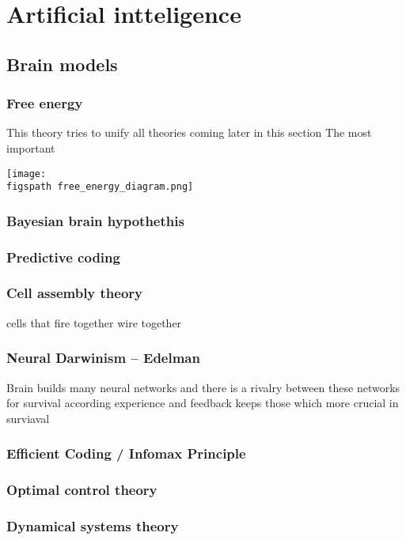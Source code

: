 \chapter{Artificial intteligence}


\section{Brain models}
    \subsection{Free energy}
        This theory tries to unify all theories coming later in this section
        The most important \cite{friston-2010-the-free-energy-principle-a-unified-brain-theory}
            
            
            \texttt{[image: \\figspath free\_energy\_diagram.png]}
    \subsection{Bayesian brain hypothethis}
    \subsection{Predictive coding}
    \subsection{Cell assembly theory}
        cells that fire together wire together
    \subsection{Neural Darwinism – Edelman}
        Brain builds many neural networks and there is a rivalry between these networks for survival according experience and feedback keeps those which more crucial in surviaval
    \subsection{Efficient Coding / Infomax Principle}
    \subsection{Optimal control theory}
    \subsection{Dynamical systems theory}
